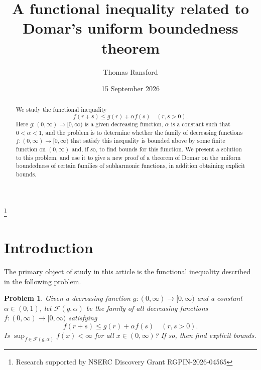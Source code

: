 \documentclass[11pt,reqno]{amsart}
\theoremstyle{plain}
\newtheorem{problem}[theorem]{Problem}
\theoremstyle{definition}
\theoremstyle{remark}
\newcommand{\cF}{\mathcal{F}}
\begin{document}
\title[A functional inequality]{A functional inequality related to Domar's uniform boundedness theorem}


\author[T. Ransford]{Thomas Ransford}
\address{D\'epartement de math\'ematiques et de statistique, Universit\'e Laval, Qu\'ebec (QC), G1V 0A6, Canada}


\date{15 September 2026}



\begin{abstract}
We study the functional inequality
\[
f(r+s)\le g(r)+\alpha f(s) \quad(r,s>0).
\]
Here $g:(0,\infty)\to[0,\infty)$ is a given decreasing function, 
$\alpha$ is a constant such that $0<\alpha<1$,
and the problem is to determine whether the family of decreasing
functions $f:(0,\infty)\to[0,\infty)$ that satisfy this inequality
is  bounded above by some finite function on $(0,\infty)$ and, if so, to find bounds for this function.
We present a  solution to this problem, and use it
to give a new proof of a theorem of Domar on the uniform boundedness
of certain families of subharmonic functions, in addition obtaining
explicit bounds.
\end{abstract}

\thanks{Research supported  by NSERC Discovery Grant RGPIN-2026-04565}


\makeatletter
{}
\makeatother


\maketitle
\section{Introduction}\label{S:Intro}

The primary object of study in this article is the
functional inequality described in the following problem.

\begin{problem}\label{Pb:fnineq}
Given a decreasing function $g:(0,\infty)\to[0,\infty)$  
and a constant $\alpha\in(0,1)$, let $\cF(g,\alpha)$ be the family of all 
decreasing functions
 $f:(0,\infty)\to[0,\infty)$
satisfying
\begin{equation}\label{E:fnineq}
f(r+s)\le g(r)+\alpha f(s) \quad(r,s>0).
\end{equation}
Is $\sup_{f\in\cF(g,\alpha)}f(x)<\infty$ for all $x\in(0,\infty)$? 
If so, then find explicit bounds.
\end{problem}
\end{document}

